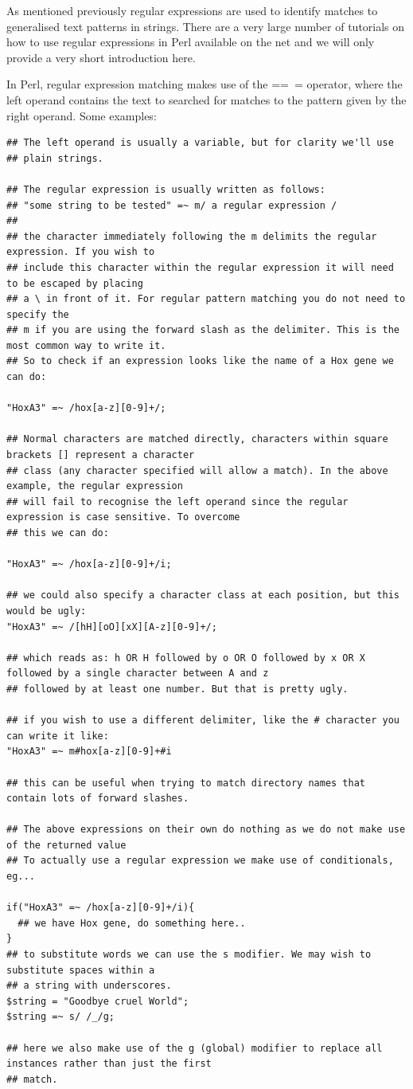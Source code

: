 \documentclass[11pt]{article}
\begin{document}
As mentioned previously regular expressions are used to identify matches
to generalised text patterns in strings. There are a very large number
of tutorials on how to use regular expressions in Perl available on the
net and we will only provide a very short introduction here.

In Perl, regular expression matching makes use of the ==~= operator,
where the left operand contains the text to searched for matches to the
pattern given by the right operand. Some examples:


\begin{verbatim}
## The left operand is usually a variable, but for clarity we'll use
## plain strings.

## The regular expression is usually written as follows:
## "some string to be tested" =~ m/ a regular expression /
##
## the character immediately following the m delimits the regular expression. If you wish to
## include this character within the regular expression it will need to be escaped by placing
## a \ in front of it. For regular pattern matching you do not need to specify the
## m if you are using the forward slash as the delimiter. This is the most common way to write it.
## So to check if an expression looks like the name of a Hox gene we can do:

"HoxA3" =~ /hox[a-z][0-9]+/;

## Normal characters are matched directly, characters within square brackets [] represent a character
## class (any character specified will allow a match). In the above example, the regular expression
## will fail to recognise the left operand since the regular expression is case sensitive. To overcome
## this we can do:

"HoxA3" =~ /hox[a-z][0-9]+/i;

## we could also specify a character class at each position, but this would be ugly:
"HoxA3" =~ /[hH][oO][xX][A-z][0-9]+/;

## which reads as: h OR H followed by o OR O followed by x OR X followed by a single character between A and z
## followed by at least one number. But that is pretty ugly.

## if you wish to use a different delimiter, like the # character you can write it like:
"HoxA3" =~ m#hox[a-z][0-9]+#i

## this can be useful when trying to match directory names that contain lots of forward slashes.

## The above expressions on their own do nothing as we do not make use of the returned value
## To actually use a regular expression we make use of conditionals, eg...

if("HoxA3" =~ /hox[a-z][0-9]+/i){
  ## we have Hox gene, do something here..
}
## to substitute words we can use the s modifier. We may wish to substitute spaces within a
## a string with underscores.
$string = "Goodbye cruel World";
$string =~ s/ /_/g;

## here we also make use of the g (global) modifier to replace all instances rather than just the first
## match.
\end{verbatim}
\end{document}

